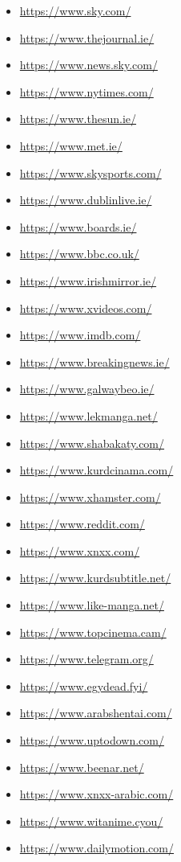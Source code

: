 \begin{multicols}{2}
\begin{itemize}
    \item \url{https://www.sky.com/}
    \item \url{https://www.thejournal.ie/}
    \item \url{https://www.news.sky.com/}
    \item \url{https://www.nytimes.com/}
    \item \url{https://www.thesun.ie/}
    \item \url{https://www.met.ie/}
    \item \url{https://www.skysports.com/}
    \item \url{https://www.dublinlive.ie/}
    \item \url{https://www.boards.ie/}
    \item \url{https://www.bbc.co.uk/}
    \item \url{https://www.irishmirror.ie/}
    \item \url{https://www.xvideos.com/}
    \item \url{https://www.imdb.com/}
    \item \url{https://www.breakingnews.ie/}
    \item \url{https://www.galwaybeo.ie/}
    \item \url{https://www.lekmanga.net/}
    \item \url{https://www.shabakaty.com/}
    \item \url{https://www.kurdcinama.com/}
    \item \url{https://www.xhamster.com/}
    \item \url{https://www.reddit.com/}
    \item \url{https://www.xnxx.com/}
    \item \url{https://www.kurdsubtitle.net/}
    \item \url{https://www.like-manga.net/}
    \item \url{https://www.topcinema.cam/}
    \item \url{https://www.telegram.org/}
    \item \url{https://www.egydead.fyi/}
    \item \url{https://www.arabshentai.com/}
    \item \url{https://www.uptodown.com/}
    \item \url{https://www.beenar.net/}
    \item \url{https://www.xnxx-arabic.com/}
    \item \url{https://www.witanime.cyou/}
    \item \url{https://www.dailymotion.com/}

\end{itemize}
\end{multicols}
